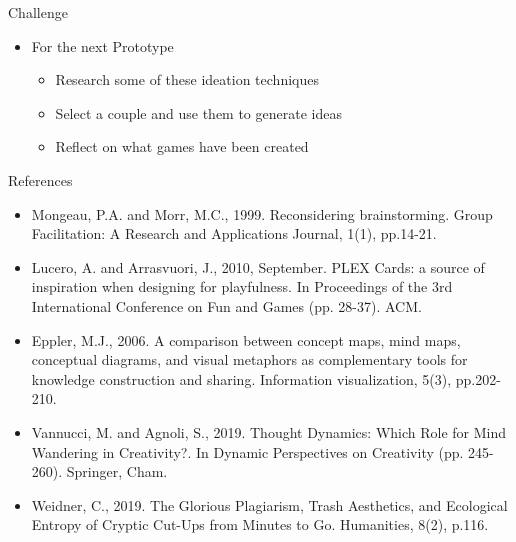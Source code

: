 


\begin{frame}{Challenge}
\begin{itemize}
	\item For the next Prototype
	\begin{itemize}
		\item Research some of these ideation techniques
		\item Select a couple and use them to generate ideas
		\item Reflect on what games have been created
	\end{itemize}
\end{itemize}
\end{frame}

\begin{frame}{References}
\begin{itemize}
	\item Mongeau, P.A. and Morr, M.C., 1999. Reconsidering brainstorming. Group Facilitation: A Research and Applications Journal, 1(1), pp.14-21.
	\item Lucero, A. and Arrasvuori, J., 2010, September. PLEX Cards: a source of inspiration when designing for playfulness. In Proceedings of the 3rd International Conference on Fun and Games (pp. 28-37). ACM.
	\item Eppler, M.J., 2006. A comparison between concept maps, mind maps, conceptual diagrams, and visual metaphors as complementary tools for knowledge construction and sharing. Information visualization, 5(3), pp.202-210.
	\item Vannucci, M. and Agnoli, S., 2019. Thought Dynamics: Which Role for Mind Wandering in Creativity?. In Dynamic Perspectives on Creativity (pp. 245-260). Springer, Cham.
	\item Weidner, C., 2019. The Glorious Plagiarism, Trash Aesthetics, and Ecological Entropy of Cryptic Cut-Ups from Minutes to Go. Humanities, 8(2), p.116.
\end{itemize}
\end{frame}


